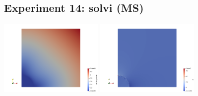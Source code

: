 \newpage
\subsection*{Experiment 14: solvi (MS)}

\begin{center}
\includegraphics[width=5cm]{python_codes/fieldstone_78/results/exp14/vel}
\includegraphics[width=5cm]{python_codes/fieldstone_78/results/exp14/p}
\end{center}


